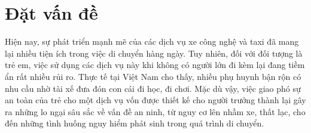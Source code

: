 \documentclass[../DoAn.tex]{subfiles}
\begin{document}





\section{Đặt vấn đề}
\label{section:1.1}
Hiện nay, sự phát triển mạnh mẽ của các dịch vụ xe công nghệ và taxi đã mang lại nhiều tiện ích trong việc di chuyển hàng ngày. Tuy nhiên, đối với đối tượng là trẻ em, việc sử dụng các dịch vụ này khi không có người lớn đi kèm lại đang tiềm ẩn rất nhiều rủi ro. Thực tế tại Việt Nam cho thấy, nhiều phụ huynh bận rộn có nhu cầu nhờ tài xế đưa đón con cái đi học, đi chơi. Mặc dù vậy, việc giao phó sự an toàn của trẻ cho một dịch vụ vốn được thiết kế cho người trưởng thành lại gây ra những lo ngại sâu sắc về vấn đề an ninh, từ nguy cơ lên nhầm xe, thất lạc, cho đến những tình huống nguy hiểm phát sinh trong quá trình di chuyển.
\end{document}
